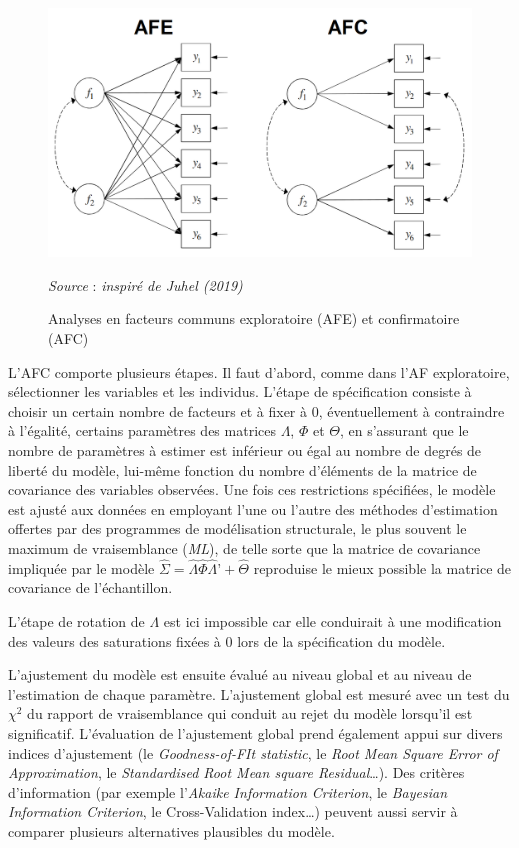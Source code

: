 \documentclass[12pt,a4paper]{reedthesis}
\begin{document}
\begin{figure}[!ht]

{\centering \includegraphics[width=0.75\linewidth]{figures/AFE_AFC} 

}

\caption[Analyses en facteurs communs exploratoire (AFE) et confirmatoire (AFC)]{Analyses en facteurs communs exploratoire (AFE) et confirmatoire (AFC)}\label{fig:afeafc}

\footnotesize


\emph{Source} : \emph{inspiré de Juhel (2019)}
\normalsize\end{figure}

L'AFC comporte plusieurs étapes. Il faut d'abord, comme dans l'AF exploratoire, sélectionner les variables et les individus. L'étape de spécification consiste à choisir un certain nombre de facteurs et à fixer à 0, éventuellement à contraindre à l'égalité, certains paramètres des matrices \(\Lambda\), \(\Phi\) et \(\Theta\), en s'assurant que le nombre de paramètres à estimer est inférieur ou égal au nombre de degrés de liberté du modèle, lui-même fonction du nombre d'éléments de la matrice de covariance des variables observées. Une fois ces restrictions spécifiées, le modèle est ajusté aux données en employant l'une ou l'autre des méthodes d'estimation offertes par des programmes de modélisation structurale, le plus souvent le maximum de vraisemblance (\emph{ML}), de telle sorte que la matrice de covariance impliquée par le modèle \(\hat \Sigma = \hat{\Lambda} \hat{\Phi} \hat{\Lambda}’ + \hat {\Theta}\) reproduise le mieux possible la matrice de covariance de l'échantillon.

L'étape de rotation de \(\Lambda\) est ici impossible car elle conduirait à une modification des valeurs des saturations fixées à 0 lors de la spécification du modèle.

L'ajustement du modèle est ensuite évalué au niveau global et au niveau de l'estimation de chaque paramètre. L'ajustement global est mesuré avec un test du \(\chi^2\) du rapport de vraisemblance qui conduit au rejet du modèle lorsqu'il est significatif. L'évaluation de l'ajustement global prend également appui sur divers indices d'ajustement (le \emph{Goodness-of-FIt statistic}, le \emph{Root Mean Square Error of Approximation}, le \emph{Standardised Root Mean square Residual}\ldots). Des critères d'information (par exemple l'\emph{Akaike Information Criterion}, le \emph{Bayesian Information Criterion}, le Cross-Validation index\ldots) peuvent aussi servir à comparer plusieurs alternatives plausibles du modèle.
\end{document}
